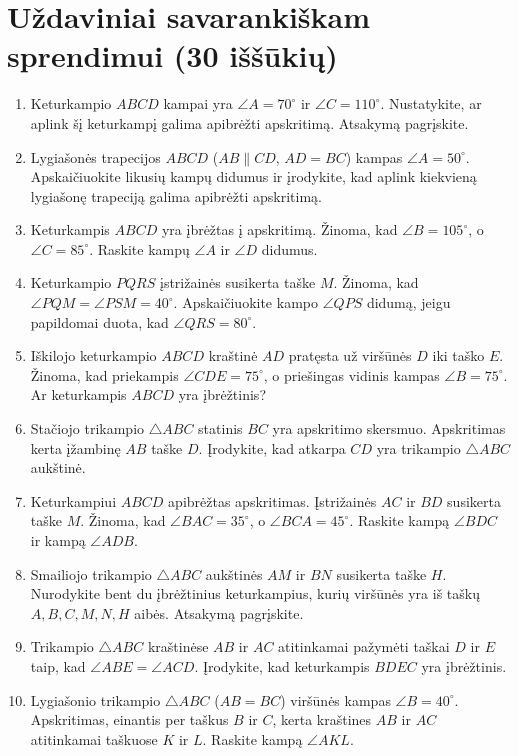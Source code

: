 \documentclass[11pt,a4paper]{scrartcl}
\begin{document}
\vspace{0.5cm}
\newpage
\section{Uždaviniai savarankiškam sprendimui (30 iššūkių)}


\begin{enumerate}
    \renewcommand{\labelenumi}{\textbf{\theenumi.}}

    \item Keturkampio $ABCD$ kampai yra $\angle A = 70^\circ$ ir $\angle C = 110^\circ$. Nustatykite, ar aplink šį keturkampį galima apibrėžti apskritimą. Atsakymą pagrįskite.
    \item Lygiašonės trapecijos $ABCD$ ($AB \parallel CD$, $AD=BC$) kampas $\angle A = 50^\circ$. Apskaičiuokite likusių kampų didumus ir įrodykite, kad aplink kiekvieną lygiašonę trapeciją galima apibrėžti apskritimą.
    \item Keturkampis $ABCD$ yra įbrėžtas į apskritimą. Žinoma, kad $\angle B = 105^\circ$, o $\angle C = 85^\circ$. Raskite kampų $\angle A$ ir $\angle D$ didumus.
    \item Keturkampio $PQRS$ įstrižainės susikerta taške $M$. Žinoma, kad $\angle PQM = \angle PSM = 40^\circ$. Apskaičiuokite kampo $\angle QPS$ didumą, jeigu papildomai duota, kad $\angle QRS = 80^\circ$.
    \item Iškilojo keturkampio $ABCD$ kraštinė $AD$ pratęsta už viršūnės $D$ iki taško $E$. Žinoma, kad priekampis $\angle CDE = 75^\circ$, o priešingas vidinis kampas $\angle B = 75^\circ$. Ar keturkampis $ABCD$ yra įbrėžtinis?
    \item Stačiojo trikampio $\triangle ABC$ statinis $BC$ yra apskritimo skersmuo. Apskritimas kerta įžambinę $AB$ taške $D$. Įrodykite, kad atkarpa $CD$ yra trikampio $\triangle ABC$ aukštinė.
    \item Keturkampiui $ABCD$ apibrėžtas apskritimas. Įstrižainės $AC$ ir $BD$ susikerta taške $M$. Žinoma, kad $\angle BAC = 35^\circ$, o $\angle BCA = 45^\circ$. Raskite kampą $\angle BDC$ ir kampą $\angle ADB$.
    \item Smailiojo trikampio $\triangle ABC$ aukštinės $AM$ ir $BN$ susikerta taške $H$. Nurodykite bent du įbrėžtinius keturkampius, kurių viršūnės yra iš taškų $A, B, C, M, N, H$ aibės. Atsakymą pagrįskite.
    \item Trikampio $\triangle ABC$ kraštinėse $AB$ ir $AC$ atitinkamai pažymėti taškai $D$ ir $E$ taip, kad $\angle ABE = \angle ACD$. Įrodykite, kad keturkampis $BDEC$ yra įbrėžtinis.
    \item Lygiašonio trikampio $\triangle ABC$ ($AB=BC$) viršūnės kampas $\angle B = 40^\circ$. Apskritimas, einantis per taškus $B$ ir $C$, kerta kraštines $AB$ ir $AC$ atitinkamai taškuose $K$ ir $L$. Raskite kampą $\angle AKL$.
\end{enumerate}
\end{document}
